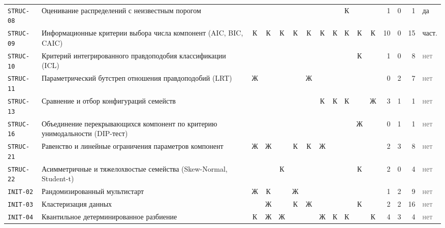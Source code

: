 \documentclass[10pt,a4paper]{article}
\begin{document}
\begin{landscape}
{\begin{longtable}{@{}l >{\raggedright\arraybackslash}p{8.2cm} *{10}{c} r r r l@{}}
\texttt{STRUC-08} & Оценивание распределений с неизвестным порогом &  &  &  &  &  &  &  & \cellcolor{hm!70}К &  &  & 1 & 0 & 1 & \cellcolor{yes!30}да \\
\texttt{STRUC-09} & Информационные критерии выбора числа компонент (AIC, BIC, CAIC) & \cellcolor{hm!70}К & \cellcolor{hm!70}К & \cellcolor{hm!70}К & \cellcolor{hm!70}К & \cellcolor{hm!70}К & \cellcolor{hm!70}К & \cellcolor{hm!70}К & \cellcolor{hm!70}К & \cellcolor{hm!70}К & \cellcolor{hm!70}К & 10 & 0 & 15 & \cellcolor{part!40}част. \\
\texttt{STRUC-10} & Критерий интегрированного правдоподобия классификации (ICL) &  &  &  &  &  &  &  &  & \cellcolor{hm!70}К &  & 1 & 0 & 8 & \textcolor{gray}{нет} \\
\texttt{STRUC-11} & Параметрический бутстреп отношения правдоподобий (LRT) & \cellcolor{hm!22}Ж &  &  &  & \cellcolor{hm!22}Ж &  &  &  &  &  & 0 & 2 & 7 & \textcolor{gray}{нет} \\
\texttt{STRUC-13} & Сравнение и отбор конфигураций семейств &  &  &  &  &  & \cellcolor{hm!70}К & \cellcolor{hm!70}К & \cellcolor{hm!70}К &  & \cellcolor{hm!22}Ж & 3 & 1 & 1 & \textcolor{gray}{нет} \\
\texttt{STRUC-16} & Объединение перекрывающихся компонент по критерию унимодальности (DIP-тест) &  &  &  &  &  &  &  &  & \cellcolor{hm!22}Ж &  & 0 & 1 & 1 & \textcolor{gray}{нет} \\
\texttt{STRUC-21} & Равенство и линейные ограничения параметров компонент & \cellcolor{hm!22}Ж & \cellcolor{hm!22}Ж &  & \cellcolor{hm!70}К & \cellcolor{hm!70}К & \cellcolor{hm!22}Ж &  &  &  &  & 2 & 3 & 8 & \textcolor{gray}{нет} \\
\texttt{STRUC-22} & Асимметричные и тяжелохвостые семейства (Skew-Normal, Student-t) &  &  & \cellcolor{hm!70}К &  &  &  &  &  & \cellcolor{hm!70}К &  & 2 & 0 & 4 & \textcolor{gray}{нет} \\
\texttt{INIT-02} & Рандомизированный мультистарт & \cellcolor{hm!22}Ж & \cellcolor{hm!70}К &  & \cellcolor{hm!22}Ж &  &  &  &  &  &  & 1 & 2 & 9 & \textcolor{gray}{нет} \\
\texttt{INIT-03} & Кластеризация данных &  & \cellcolor{hm!22}Ж &  & \cellcolor{hm!70}К & \cellcolor{hm!22}Ж &  &  &  & \cellcolor{hm!70}К &  & 2 & 2 & 16 & \textcolor{gray}{нет} \\
\texttt{INIT-04} & Квантильное детерминированное разбиение & \cellcolor{hm!70}К & \cellcolor{hm!22}Ж & \cellcolor{hm!22}Ж &  &  & \cellcolor{hm!22}Ж & \cellcolor{hm!70}К & \cellcolor{hm!70}К &  & \cellcolor{hm!70}К & 4 & 3 & 4 & \textcolor{gray}{нет} \\

\end{longtable}}
\end{landscape}
\end{document}
